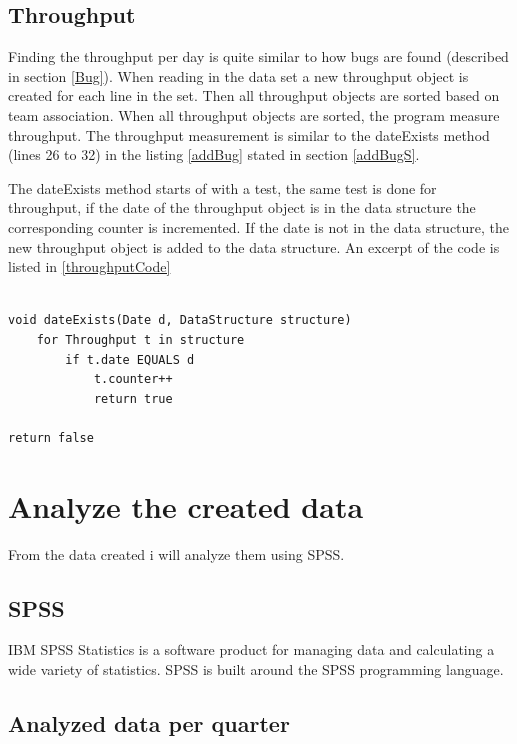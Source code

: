 \documentclass[UKenglish]{ifimaster}  %
\begin{document}
 \subsection{Throughput}
Finding the throughput per day is quite similar to how bugs are found (described in section \ref{Bug}).  When reading in the data set a new throughput object is created for each line in the set.  Then all throughput objects are sorted based on team association. When all throughput objects are sorted, the program measure throughput. The throughput measurement is similar to the dateExists method (lines 26 to 32) in the listing \ref{addBug} stated in section \ref{addBugS}. 

\newpage
The dateExists method starts of with a test, the same test is done for throughput, if the date of the throughput object is in the data structure the corresponding counter is incremented.  If the date is not in the data structure, the new throughput object is added to the data structure. An excerpt of the code is listed in \ref{throughputCode} 

\begin{lstlisting}[caption=Pseudocode example of how throughput is measured, label=throughputCode]

void dateExists(Date d, DataStructure structure)
	for Throughput t in structure
		if t.date EQUALS d
			t.counter++
			return true
			
return false	
\end{lstlisting}
 
\section{Analyze the created data}
From the data created i will analyze them using SPSS.
\subsection{SPSS}
IBM SPSS Statistics is a software product for managing data and calculating a wide variety of statistics. SPSS is built around the SPSS programming language. 

\subsection{Analyzed data per quarter}
\end{document}
